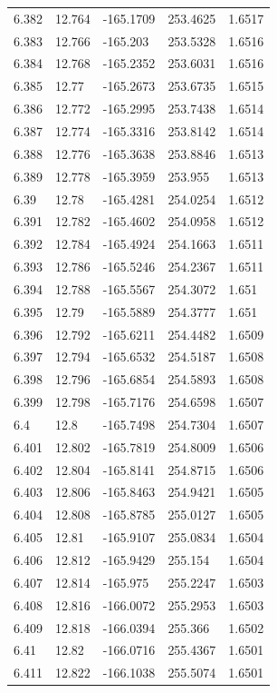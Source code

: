 \begin{tabular}{lllll}
6.382 & 12.764 & -165.1709 & 253.4625 & 1.6517 \\
6.383 & 12.766 & -165.203 & 253.5328 & 1.6516 \\
6.384 & 12.768 & -165.2352 & 253.6031 & 1.6516 \\
6.385 & 12.77 & -165.2673 & 253.6735 & 1.6515 \\
6.386 & 12.772 & -165.2995 & 253.7438 & 1.6514 \\
6.387 & 12.774 & -165.3316 & 253.8142 & 1.6514 \\
6.388 & 12.776 & -165.3638 & 253.8846 & 1.6513 \\
6.389 & 12.778 & -165.3959 & 253.955 & 1.6513 \\
6.39 & 12.78 & -165.4281 & 254.0254 & 1.6512 \\
6.391 & 12.782 & -165.4602 & 254.0958 & 1.6512 \\
6.392 & 12.784 & -165.4924 & 254.1663 & 1.6511 \\
6.393 & 12.786 & -165.5246 & 254.2367 & 1.6511 \\
6.394 & 12.788 & -165.5567 & 254.3072 & 1.651 \\
6.395 & 12.79 & -165.5889 & 254.3777 & 1.651 \\
6.396 & 12.792 & -165.6211 & 254.4482 & 1.6509 \\
6.397 & 12.794 & -165.6532 & 254.5187 & 1.6508 \\
6.398 & 12.796 & -165.6854 & 254.5893 & 1.6508 \\
6.399 & 12.798 & -165.7176 & 254.6598 & 1.6507 \\
6.4 & 12.8 & -165.7498 & 254.7304 & 1.6507 \\
6.401 & 12.802 & -165.7819 & 254.8009 & 1.6506 \\
6.402 & 12.804 & -165.8141 & 254.8715 & 1.6506 \\
6.403 & 12.806 & -165.8463 & 254.9421 & 1.6505 \\
6.404 & 12.808 & -165.8785 & 255.0127 & 1.6505 \\
6.405 & 12.81 & -165.9107 & 255.0834 & 1.6504 \\
6.406 & 12.812 & -165.9429 & 255.154 & 1.6504 \\
6.407 & 12.814 & -165.975 & 255.2247 & 1.6503 \\
6.408 & 12.816 & -166.0072 & 255.2953 & 1.6503 \\
6.409 & 12.818 & -166.0394 & 255.366 & 1.6502 \\
6.41 & 12.82 & -166.0716 & 255.4367 & 1.6501 \\
6.411 & 12.822 & -166.1038 & 255.5074 & 1.6501 \\

\end{tabular}
